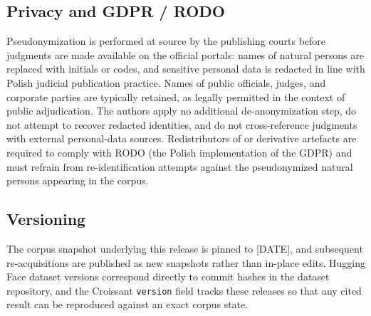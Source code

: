 \subsection{Privacy and GDPR / RODO}
\label{sec:acquisition:privacy}

Pseudonymization is performed at source by the publishing courts before judgments are made available on the official portals: names of natural persons are replaced with initials or codes, and sensitive personal data is redacted in line with Polish judicial publication practice. Names of public officials, judges, and corporate parties are typically retained, as legally permitted in the context of public adjudication. The authors apply no additional de-anonymization step, do not attempt to recover redacted identities, and do not cross-reference judgments with external personal-data sources. Redistributors of \juddgespl{} or derivative artefacts are required to comply with RODO (the Polish implementation of the GDPR) and must refrain from re-identification attempts against the pseudonymized natural persons appearing in the corpus.

\subsection{Versioning}
\label{sec:acquisition:versioning}

The corpus snapshot underlying this release is pinned to [DATE], and subsequent re-acquisitions are published as new snapshots rather than in-place edits. Hugging Face dataset versions correspond directly to commit hashes in the dataset repository, and the Croissant \texttt{version} field tracks these releases so that any cited result can be reproduced against an exact corpus state.
